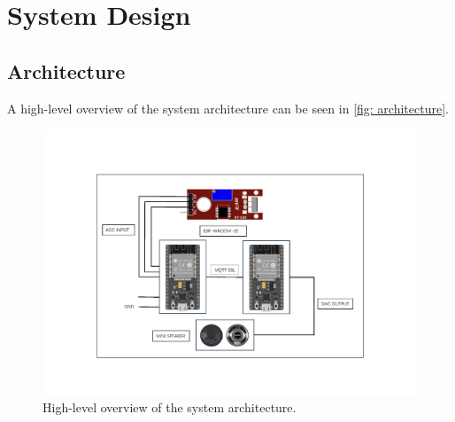 \documentclass[conference]{IEEEtran}
\begin{document}

\section{System Design}
\label{sec:system_design}

\subsection{Architecture}

A high-level overview of the system architecture can be seen in \cref{fig: architecture}.

\begin{figure}[h]
    \hspace*{-0.4cm}
    \includegraphics[width=1.2\linewidth]{assets/diagram.png}
    \vspace{-1.5cm}
    \caption{High-level overview of the system architecture.}
    \label{fig:architecture}
\end{figure}
\end{document}
